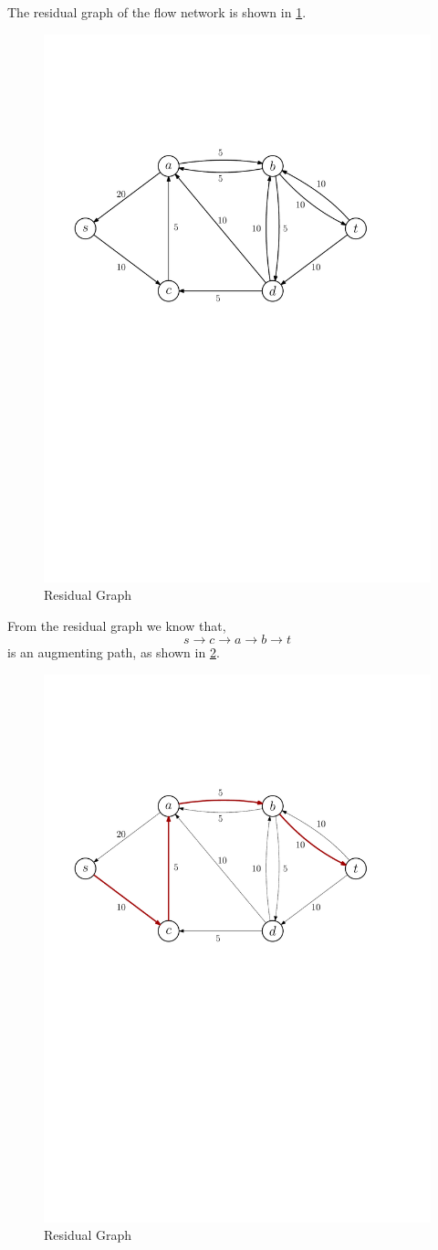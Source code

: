 \documentclass[12pt,letterpaper,titlepage,en-US]{article}
\begin{document}
\begin{homeworkProblem}
    \begin{homeworkSubProblem}

The residual graph of the flow network is shown in \cref{p3a}.
\begin{figure}[H]
    \caption{Residual Graph}\label{p3a}
    \centering
    \includegraphics[width=.6\textwidth]{p3a}
\end{figure}


\end{homeworkSubProblem}
\begin{homeworkSubProblem}
From the residual graph we know that,
\[s \longrightarrow c \longrightarrow a \longrightarrow b \longrightarrow t\]
is an augmenting path, as shown in \cref{p3b}.
\begin{figure}[H]
    \caption{Residual Graph}\label{p3b}
    \centering
    \includegraphics[width=.6\textwidth]{p3b}
\end{figure}


\end{homeworkSubProblem}
\end{homeworkProblem}
\end{document}
